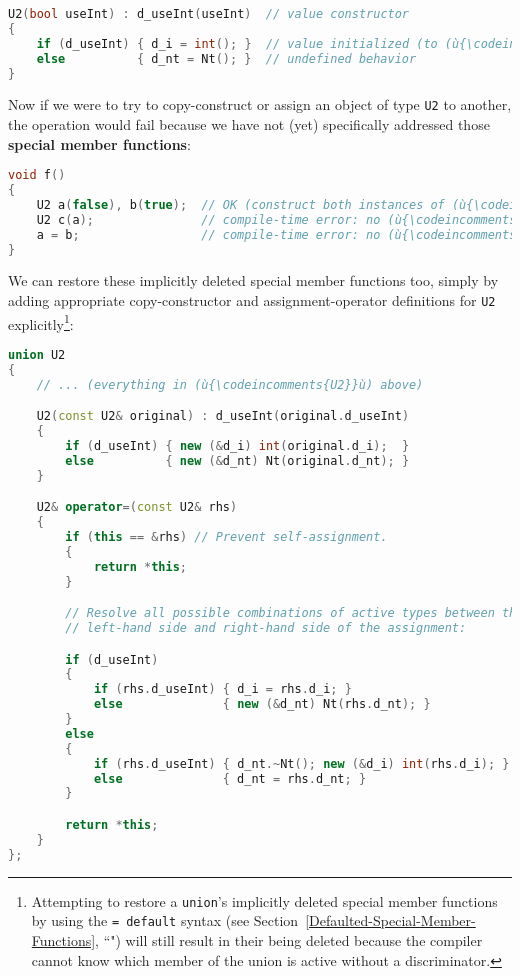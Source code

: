 \begin{lstlisting}[language=C++]
U2(bool useInt) : d_useInt(useInt)  // value constructor
{
    if (d_useInt) { d_i = int(); }  // value initialized (to (ù{\codeincomments{0}}ù))
    else          { d_nt = Nt(); }  // undefined behavior
}
\end{lstlisting}
    
\noindent Now if we were to try to copy-construct or assign an object of type
\texttt{U2} to another, the operation would fail because we have not
(yet) specifically addressed those \textbf{special member functions}:

\begin{lstlisting}[language=C++]
void f()
{
    U2 a(false), b(true);  // OK (construct both instances of (ù{\codeincomments{U2}}ù))
    U2 c(a);               // compile-time error: no (ù{\codeincomments{U2(const U2\&)}}ù)
    a = b;                 // compile-time error: no (ù{\codeincomments{U2\& operator=(const U2\&)}}ù)
}
\end{lstlisting}
    
\noindent We can restore these implicitly deleted special member functions too,
simply by adding appropriate copy-constructor and assignment-operator
definitions for \texttt{U2} explicitly{\cprotect\footnote{Attempting to
restore a \texttt{union}'s implicitly deleted special member
functions by using the \texttt{=}~\texttt{default} syntax (see
Section~\ref{Defaulted-Special-Member-Functions}, ``") will still result in their being deleted because
the compiler cannot know which member of the union is active without a
  discriminator.}}:

\begin{lstlisting}[language=C++]
union U2
{
    // ... (everything in (ù{\codeincomments{U2}}ù) above)

    U2(const U2& original) : d_useInt(original.d_useInt)
    {
        if (d_useInt) { new (&d_i) int(original.d_i);  }
        else          { new (&d_nt) Nt(original.d_nt); }
    }

    U2& operator=(const U2& rhs)
    {
        if (this == &rhs) // Prevent self-assignment.
        {
            return *this;
        }

        // Resolve all possible combinations of active types between the 
        // left-hand side and right-hand side of the assignment:

        if (d_useInt)
        {
            if (rhs.d_useInt) { d_i = rhs.d_i; }
            else              { new (&d_nt) Nt(rhs.d_nt); }
        }
        else
        {
            if (rhs.d_useInt) { d_nt.~Nt(); new (&d_i) int(rhs.d_i); }
            else              { d_nt = rhs.d_nt; }
        }

        return *this;
    }
};
\end{lstlisting}
    

